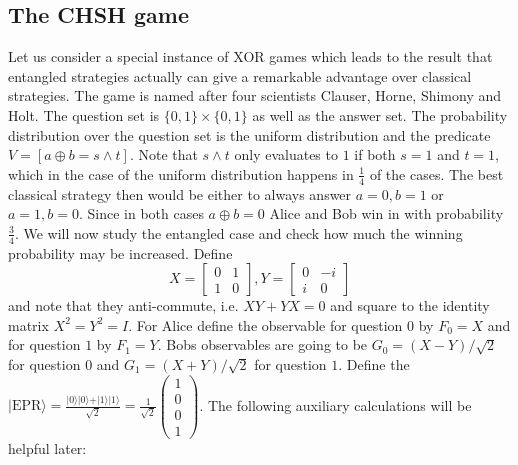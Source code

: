 \subsection{The CHSH game}\label{CHSH}
Let us consider a special instance of XOR games which leads to the result that entangled strategies actually can give a remarkable advantage over classical strategies. The game is named after four scientists Clauser, Horne, Shimony and Holt. The question set is $\{0,1\} \times \{0,1\}$ as well as the answer set. The probability distribution over the question set is the uniform distribution and the predicate $V = \left[ a \oplus b = s \land t\right] $. Note that $s \land t$ only evaluates to $1$ if both $s=1$ and $t=1$, which in the case of the uniform distribution happens in $\frac{1}{4}$ of the cases. The best classical strategy then would be either to always answer $a=0, b=1$ or $a=1, b=0$. Since in both cases $a \oplus b = 0$ Alice and Bob win in with probability $\frac{3}{4}$. We will now study the entangled case and check how much the winning probability may be increased. 
Define 
\begin{equation}
X = \begin{bmatrix}
0 & 1 \\
1 & 0
\end{bmatrix} , Y = \begin{bmatrix}
0 & -i \\ 
i & 0 
\end{bmatrix}
\end{equation}
and note that they anti-commute, i.e. $XY + YX = 0$ and square to the identity matrix $X^2 = Y^2 = I$. For Alice define the observable for question $0$ by $F_0 = X$ and for question $1$ by $F_1 = Y$. Bobs observables are going to be $G_0 = (X-Y)/ \sqrt{2}$ for question $0$ and $G_1 = (X+Y)/\sqrt{2}$ for question $1$.  Define the $\vert \text{EPR} \rangle = \frac{\vert 0 \rangle \vert 0 \rangle + \vert 1 \rangle \vert 1 \rangle}{\sqrt{2}} = \frac{1}{\sqrt{2}} \begin{pmatrix} 1 \\ 0 \\ 0 \\ 1 \end{pmatrix}$.
The following auxiliary calculations will be helpful later: 
